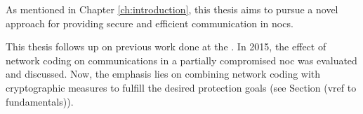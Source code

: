 As mentioned in Chapter \ref{ch:introduction}, this thesis aims to pursue a novel approach for providing secure and efficient communication in
\glspl{noc}.

This thesis follows up on previous work done at the \thechair. In 2015, the effect of network coding
on communications in a partially compromised \gls{noc} was evaluated and discussed. Now, the emphasis lies on combining network coding with
cryptographic measures to fulfill the desired protection goals (see Section (vref to fundamentals)). %
